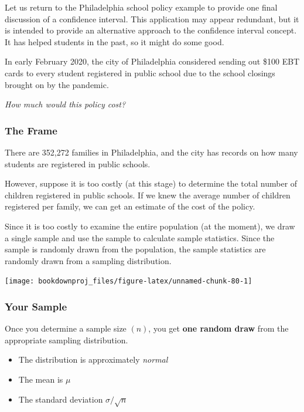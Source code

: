 \documentclass[
]{book}
\begin{document}
Let us return to the Philadelphia school policy example to provide one final discussion of a confidence interval. This application may appear redundant, but it is intended to provide an alternative approach to the confidence interval concept. It has helped students in the past, so it might do some good.

In early February 2020, the city of Philadelphia considered sending out \$100 EBT cards to every student registered in public school due to the school closings brought on by the pandemic.

\emph{How much would this policy cost?}

\hypertarget{the-frame}{%
\subsubsection*{The Frame}\label{the-frame}}

There are 352,272 families in Philadelphia, and the city has records on how many students are registered in public schools.

However, suppose it is too costly (at this stage) to determine the total number of children registered in public schools. If we knew the average number of children registered per family, we can get an estimate of the cost of the policy.

Since it is too costly to examine the entire population (at the moment), we draw a single sample and use the sample to calculate sample statistics. Since the sample is randomly drawn from the population, the sample statistics are randomly drawn from a sampling distribution.

\begin{center}\texttt{[image: bookdownproj\_files/figure-latex/unnamed-chunk-80-1]} \end{center}

\hypertarget{your-sample}{%
\subsubsection*{Your Sample}\label{your-sample}}

Once you determine a sample size \((n)\), you get \textbf{one random draw} from the appropriate sampling distribution.

\begin{itemize}
\item
  The distribution is approximately \emph{normal}
\item
  The mean is \(\mu\)
\item
  The standard deviation \(\sigma/\sqrt{n}\)
\end{itemize}
\end{document}
